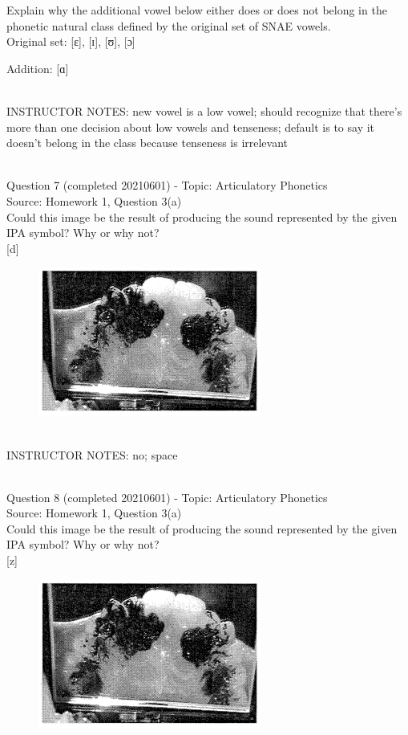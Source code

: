 \documentclass[12pt]{article}
\begin{document}
Explain why the additional vowel below either does or does not belong in the phonetic natural class defined by the original set of SNAE vowels.\\

Original set: {[ɛ]}, {[ɪ]}, {[ʊ]}, {[ɔ]}

Addition: {[ɑ]}


~\\
INSTRUCTOR NOTES: new vowel is a low vowel; should recognize that there's more than one decision about low vowels and tenseness; default is to say it doesn't belong in the class because tenseness is irrelevant


~\\

{\large Question 7} (completed 20210601) - Topic: Articulatory Phonetics\\
Source: Homework 1, Question 3(a)\\

Could this image be the result of producing the sound represented by the given IPA symbol? Why or why not?\\

{[d]}

\begin{figure}[H]
\includegraphics{../images/staticpalatography_fricative.png}
\end{figure}

~\\
INSTRUCTOR NOTES: no; space


~\\

{\large Question 8} (completed 20210601) - Topic: Articulatory Phonetics\\
Source: Homework 1, Question 3(a)\\

Could this image be the result of producing the sound represented by the given IPA symbol? Why or why not?\\

{[z]}

\begin{figure}[H]
\includegraphics{../images/staticpalatography_fricative.png}
\end{figure}
\end{document}
